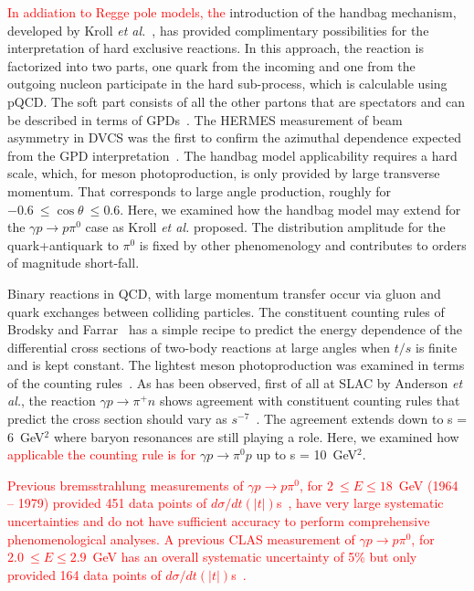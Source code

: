 \documentclass[aps,prc,twocolumn,floatfix,showpacs,preprintnumbers,amsmath,amssymb,superscriptaddress,linenumbers]{revtex4-1}
\begin{document}
 
\textcolor{red}{In addiation to Regge pole models, the} introduction of the handbag mechanism, developed by 
Kroll \textit{et al.}~\cite{Huang:2000kd}, has provided complimentary 
possibilities for the interpretation of hard exclusive reactions. In 
this approach, the reaction is factorized into two parts, one quark 
from the incoming and one from the outgoing nucleon participate in the 
hard sub-process, which is calculable using pQCD. The soft part 
consists of all the other partons that are spectators and can be 
described in terms of GPDs~\cite{Ji:1996nm}.
The HERMES measurement of beam asymmetry in DVCS was the first 
to confirm the azimuthal dependence expected from the GPD interpretation~\cite{Amarian:2000vx}.
The handbag model applicability requires a hard scale, which, for meson 
photoproduction, is only provided by large transverse momentum. That 
corresponds to large angle production, roughly for 
$-0.6~\leq\cos\theta~\leq 0.6$.  Here, we examined how the handbag 
model may extend for the $\gamma p\rightarrow p\pi^0$ case as Kroll 
\textit{et al.} proposed. The distribution amplitude for the 
quark+antiquark to $\pi^0$ is fixed by other phenomenology and 
contributes to orders of magnitude short-fall.


Binary reactions in QCD, with large momentum transfer 
occur via gluon and quark exchanges between colliding particles. The 
constituent counting rules of Brodsky and Farrar~\cite{Brodsky:1973kr} 
has a simple recipe to predict the energy dependence of the 
differential cross sections of two-body reactions at large angles 
when $t/s$ is finite and is kept constant.  The lightest meson 
photoproduction was examined in terms of the counting 
rules~\cite{Anderson:1976ph,Jenkins:1995bk,Zhu:2002su,Chen:2009sda,
Kong:2015yzn}. As has been observed, first of all at SLAC by 
Anderson \textit{et al.}, the reaction $\gamma p\rightarrow\pi^+n$ 
shows agreement with constituent counting rules that predict the 
cross section should vary as $s^{-7}$~\cite{Anderson:1976ph}. The 
agreement extends down to s = 6~GeV$^2$ where baryon resonances are 
still playing a role.  Here, we examined how \textcolor{red}{applicable the counting rule is 
for} $\gamma p\rightarrow\pi^0p$ up to s = 10~GeV$^2$. 

\textcolor{red}{Previous bremsstrahlung measurements of $\gamma p\rightarrow p\pi^0$, for $2~\leq E\leq 
18$~GeV (1964 -- 1979) provided 451 data points of $d\sigma/dt(|t|)$s~\cite{brem}, have very large systematic 
uncertainties and do not have sufficient accuracy to perform 
comprehensive phenomenological analyses.  A previous CLAS measurement of $\gamma p\rightarrow p\pi^0$, for $2.0~\leq E\leq 2.9$~GeV has an overall systematic uncertainty of 5\% but only provided 164 data points of $d\sigma/dt(|t|)$s~\cite{Dugger:2007bt}.}
\end{document}
